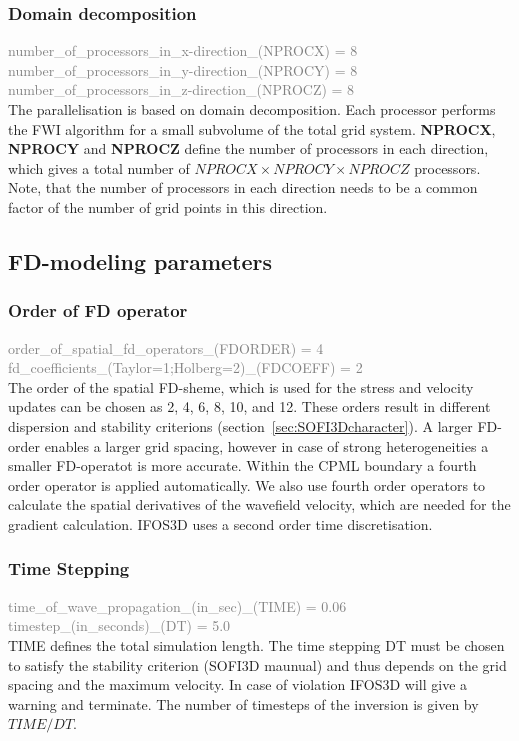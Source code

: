 \subsubsection*{Domain decomposition}
\textcolor {Gray}{number\_of\_processors\_in\_x-direction\_(NPROCX) = 8\\
number\_of\_processors\_in\_y-direction\_(NPROCY) = 8\\
number\_of\_processors\_in\_z-direction\_(NPROCZ) = 8} \vspace{0.1cm}\\
The parallelisation is based on domain decomposition. Each processor performs the FWI algorithm for a small subvolume of the total grid system. \textbf{NPROCX}, \textbf{NPROCY} and \textbf{NPROCZ} define the number of processors in each direction, which gives a total number of $NPROCX\times NPROCY\times NPROCZ$ processors. Note, that the number of processors in each direction needs to be a common factor of the number of grid points in this direction.

\subsection{FD-modeling parameters}
\subsubsection*{Order of FD operator}
\textcolor{Gray}{
order\_of\_spatial\_fd\_operators\_(FDORDER) = 4\\
fd\_coefficients\_(Taylor=1;Holberg=2)\_(FDCOEFF) = 2}\vspace{0.1cm}\\
The order of the spatial FD-sheme,  which is used for the stress and velocity updates can be chosen as 2, 4, 6, 8, 10, and 12. These orders result in different dispersion and stability criterions (section~\ref{sec:SOFI3Dcharacter}). A larger FD-order enables a larger grid spacing, however in case of strong heterogeneities a smaller FD-operatot is more accurate. Within the CPML boundary a fourth order operator is applied automatically. We also use fourth order operators to calculate the spatial derivatives of the wavefield velocity, which are needed for the gradient calculation. IFOS3D uses a second order time discretisation.
\subsubsection*{Time Stepping}
\textcolor {Gray}{
time\_of\_wave\_propagation\_(in\_sec)\_(TIME) = 0.06\\
timestep\_(in\_seconds)\_(DT) = 5.0}\vspace{0.1cm}\\
TIME defines the total simulation length.  The time stepping DT must be chosen to satisfy the stability criterion (SOFI3D  maunual) and thus depends on the grid spacing and the maximum velocity. In case of violation IFOS3D will give a warning and terminate. The number of timesteps of the inversion is given by $TIME/DT$.

